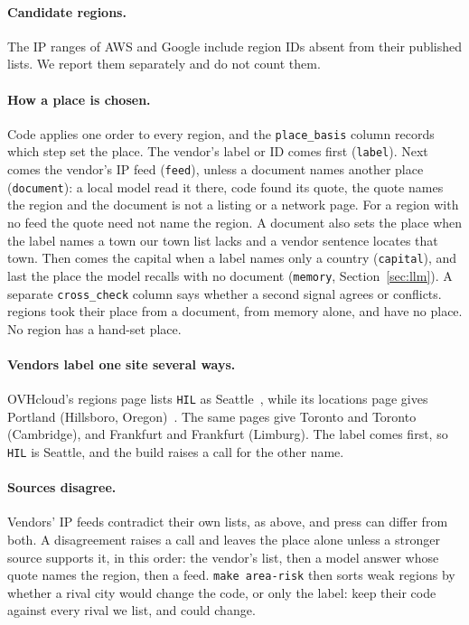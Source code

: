 \documentclass[10pt,twocolumn]{article}
\newcommand{\code}[1]{\texttt{#1}}
\begin{document}
\paragraph{Candidate regions.} The IP ranges of AWS and Google include \candidateCount{} region IDs absent from their published lists. We report them separately and do not count them.

\paragraph{How a place is chosen.} Code applies one order to every region, and the \code{place\_basis} column records which step set the place. The vendor's label or ID comes first (\code{label}). Next comes the vendor's IP feed (\code{feed}), unless a document names another place (\code{document}): a local model read it there, code found its quote, the quote names the region and the document is not a listing or a network page. For a region with no feed the quote need not name the region. A document also sets the place when the label names a town our town list lacks and a vendor sentence locates that town. Then comes the capital when a label names only a country (\code{capital}), and last the place the model recalls with no document (\code{memory}, Section~\ref{sec:llm}). A separate \code{cross\_check} column says whether a second signal agrees or conflicts. \placedByDocument{} regions took their place from a document, \placedByMemory{} from memory alone, and \placedNone{} have no place. No region has a hand-set place.

\paragraph{Vendors label one site several ways.} OVHcloud's regions page lists \code{HIL} as Seattle~\citep{ovh_regions}, while its locations page gives Portland (Hillsboro, Oregon)~\citep{ovh_locations_us}. The same pages give Toronto and Toronto (Cambridge), and Frankfurt and Frankfurt (Limburg). The label comes first, so \code{HIL} is Seattle, and the build raises a call for the other name.

\paragraph{Sources disagree.} Vendors' IP feeds contradict their own lists, as above, and press can differ from both. A disagreement raises a call and leaves the place alone unless a stronger source supports it, in this order: the vendor's list, then a model answer whose quote names the region, then a feed. \code{make area-risk} then sorts weak regions by whether a rival city would change the code, or only the label: \areaRiskSafe{} keep their code against every rival we list, and \areaRiskAtRisk{} could change.
\end{document}
